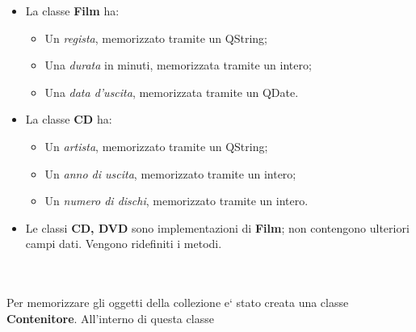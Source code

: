 {\begin{itemize}
			\item La classe \textbf{Film} ha:
			\begin{itemize}
				\item Un \textit{regista}, memorizzato tramite un QString;
				\item Una \textit{durata} in minuti, memorizzata tramite un intero;
				\item Una \textit{data d'uscita}, memorizzata tramite un QDate.
			\end{itemize}
			\item La classe \textbf{CD}  ha:
			\begin{itemize}
				\item Un \textit{artista}, memorizzato tramite un QString;
				\item Un \textit{anno di uscita}, memorizzato tramite un intero;
				\item Un \textit{numero di dischi}, memorizzato tramite un intero.
			\end{itemize}
			\item Le classi \textbf{CD, DVD} sono implementazioni di \textbf{Film}; non contengono ulteriori campi dati. Vengono ridefiniti i metodi.
		\end{itemize}
		\\
		\\
		Per memorizzare gli oggetti della collezione e` stato creata una classe \textbf{Contenitore}. All'interno di questa classe 
}